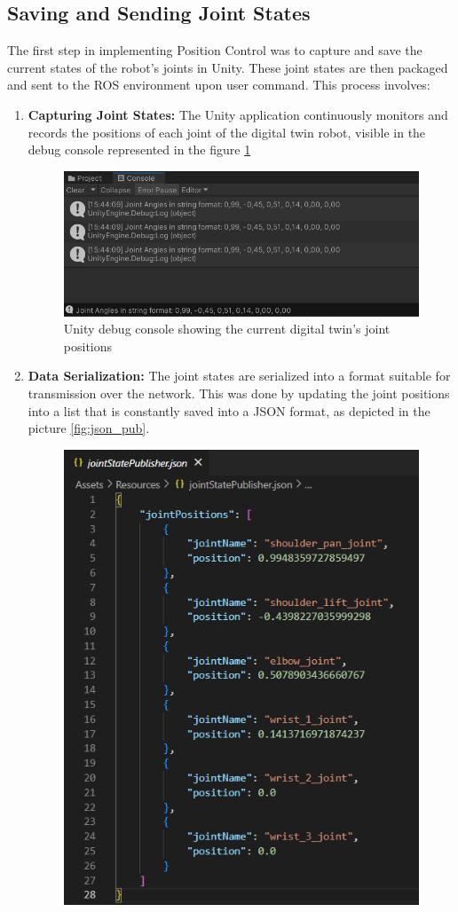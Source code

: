     \subsection{Saving and Sending Joint States}
    The first step in implementing Position Control was to capture and save the current states of the robot's joints in Unity. These joint states are then packaged and sent to the ROS environment upon user command. This process involves:
    \begin{enumerate}
        \item \textbf{Capturing Joint States:} The Unity application continuously monitors and records the positions of each joint of the digital twin robot, visible in the debug console represented in the figure \ref{fig:debug_joint_state}
        \begin{figure}[htpb]
            \centering
            \includegraphics[width=0.8\linewidth]{figs/JointState_debug.png}
            \caption{Unity debug console showing the current digital twin's joint positions}
            \label{fig:debug_joint_state}
        \end{figure}
        \item \textbf{Data Serialization:} The joint states are serialized into a format suitable for transmission over the network. This was done by updating the joint positions into a list that is constantly saved into a JSON format, as depicted in the picture \ref{fig:json_pub}.
            \begin{figure}[htbp]
            \centering
            \includegraphics[width=0.5\linewidth]{figs/joint_states_json.png}

\end{figure}
\end{enumerate}
